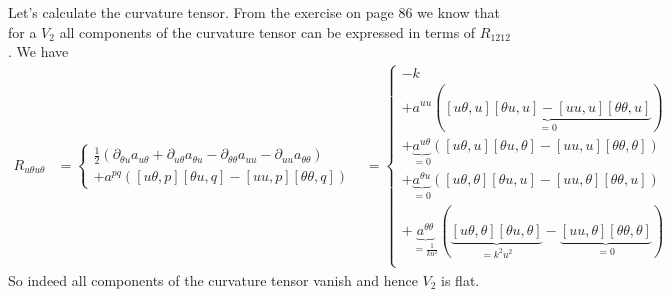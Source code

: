 Let's calculate the curvature tensor. From the exercise on page 86 we know that for a $V_2$ all components of the curvature tensor can be expressed in terms of $R_{1212}$. We have
\begin{align*}
R_{u\theta u\theta} &= \left \{ \begin{array}{l}
\frac{1}{2}\left(\partial_{\theta u}a_{u \theta}+\partial_{u \theta}a_{\theta u}-\partial_{\theta \theta}a_{uu}-\partial_{u u}a_{\theta \theta}  \right) \\
 + a^{pq}\left([u \theta,p][\theta u,q] -[u u,p][\theta \theta,q]  \right)
\end{array} \right.
&= \left \{ \begin{array}{l}
-k \\
 + a^{uu}\left(\underbrace{[u \theta,u][\theta u,u] -[u u,u][\theta \theta,u]}_{=0}  \right)\\
 + \underbrace{a^{u \theta}}_{=0}\left([u \theta,u][\theta u,\theta] -[u u,u][\theta \theta,\theta]  \right)\\
 + \underbrace{a^{\theta u}}_{=0}\left([u \theta,\theta][\theta u,u] -[u u,\theta][\theta \theta,u]  \right)\\
 + \underbrace{a^{\theta \theta}}_{=\frac{1}{ku^2}}\left(\underbrace{[u \theta,\theta][\theta u,\theta]}_{= k^2u^2} -\underbrace{[u u,\theta][\theta \theta,\theta]}_{=0}  \right)\\
\end{array} \right.
\end{align*}
So indeed all components of the curvature tensor vanish and hence $V_2$ is flat.

